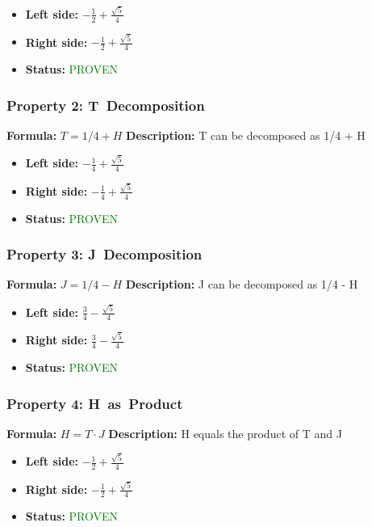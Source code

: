 \begin{itemize}
\item \textbf{Left side:} $- \frac{1}{2} + \frac{\sqrt{5}}{4}$
\item \textbf{Right side:} $- \frac{1}{2} + \frac{\sqrt{5}}{4}$
\item \textbf{Status:} \textcolor{green}{PROVEN}
\end{itemize}

\subsubsection*{Property 2: T~Decomposition}
\textbf{Formula:} $T = 1/4 + H$
\textbf{Description:} T can be decomposed as 1/4 + H

\begin{itemize}
\item \textbf{Left side:} $- \frac{1}{4} + \frac{\sqrt{5}}{4}$
\item \textbf{Right side:} $- \frac{1}{4} + \frac{\sqrt{5}}{4}$
\item \textbf{Status:} \textcolor{green}{PROVEN}
\end{itemize}

\subsubsection*{Property 3: J~Decomposition}
\textbf{Formula:} $J = 1/4 - H$
\textbf{Description:} J can be decomposed as 1/4 - H

\begin{itemize}
\item \textbf{Left side:} $\frac{3}{4} - \frac{\sqrt{5}}{4}$
\item \textbf{Right side:} $\frac{3}{4} - \frac{\sqrt{5}}{4}$
\item \textbf{Status:} \textcolor{green}{PROVEN}
\end{itemize}

\subsubsection*{Property 4: H~as~Product}
\textbf{Formula:} $H = T \cdot J$
\textbf{Description:} H equals the product of T and J

\begin{itemize}
\item \textbf{Left side:} $- \frac{1}{2} + \frac{\sqrt{5}}{4}$
\item \textbf{Right side:} $- \frac{1}{2} + \frac{\sqrt{5}}{4}$
\item \textbf{Status:} \textcolor{green}{PROVEN}
\end{itemize}

